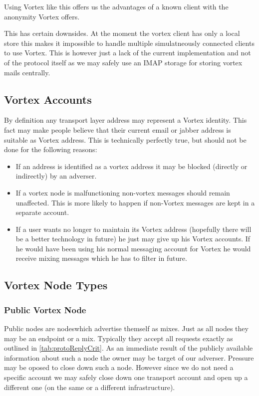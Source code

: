 Using Vortex like this offers us the advantages of a known client with the anonymity Vortex offers.

This has certain downsides. At the moment the vortex client has only a local store this makes it impossible to handle multiple simulatneously connected clients to use Vortex. This is however just a lack of the current implementation and not of the protocol itself as we may safely use an IMAP storage for storing vortex mails centrally.

\subsection{Vortex Accounts}
By definition any transport layer address may represent a Vortex identity. This fact may make people believe that their current email or jabber address is suitable as Vortex address. This is technically perfectly true, but should not be done for the following reasons:

\begin{itemize}
	\item If an address is identified as a vortex address it may be blocked (directly or indirectly) by an adverser.
	\item If a vortex node is malfunctioning non-vortex messages should remain unaffected. This is more likely to happen if non-Vortex messages are kept in a separate account.
	\item If a user wants no longer to maintain its Vortex address (hopefully there will be a better technology in future) he just may give up his Vortex accounts. If he would have been using his normal messaging account for Vortex he would receive mixing messages which he has to filter in future.
\end{itemize}

\subsection{Vortex Node Types}

\subsubsection{Public Vortex Node}
Public nodes are nodeswhich advertise themself as mixes. Just as all nodes they may be an endpoint or a mix. Typically they accept all requests exactly as outlined in \ref{tab:protoReplyCrit}. As an immediate result of the publicly available information about such a node the owner may be target of our adverser. Pressure may be oposed to close down such a node. However since we do not need a specific account we may safely close down one transport account and open up a different one (on the same or a different infrastructure).


